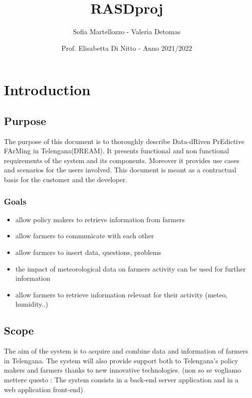 \documentclass{article}
\title{RASDproj}
\date{Prof. Elisabetta Di Nitto  -  Anno 2021/2022}
\author{Sofia Martellozzo - 
      Valeria Detomas 
}
\begin{document}
\maketitle
\newpage
\renewcommand\contentsname{Contents}
\tableofcontents

\newpage

\section{Introduction}

\subsection{Purpose}
The purpose of this document is to thoroughly describe 
Data-dRiven PrEdictive FArMing in Telengana(DREAM).
It presents functional and non functional requirements of the system and its components.
Moreover it provides use cases and scenarios for the users involved.
\newline
This document is meant as a contractual basis for the customer and the developer.

\subsubsection{Goals}
\begin{itemize}
    \item  allow policy makers to retrieve information from farmers
\item allow farmers to communicate with each other
\item allow farmers to insert data, questions, problems
\item the impact of meteorological data on farmers activity can be used for further information
\item allow farmers to retrieve information relevant for their activity (meteo, humidity..)
\end{itemize}

\subsection{Scope}
 The aim of the system is to acquire and combine data and information of farmers in Telengana. 
The system will also provide support both to Telengana's policy makers and farmers thanks to 
new innovative technologies.
\newline
(non so se vogliamo mettere questo : The system consists in a back-end server application and in a web application front-end)
\newline
\end{document}
